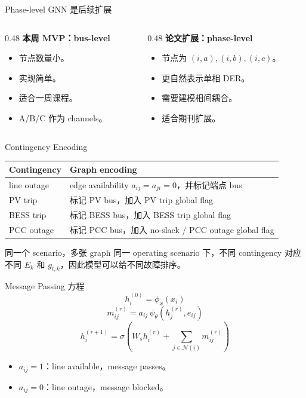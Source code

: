 \documentclass[aspectratio=169,11pt]{beamer}
\begin{document}
\begin{frame}{Phase-level GNN 是后续扩展}
\begin{columns}
\begin{column}{0.48\textwidth}
\textbf{本周 MVP：bus-level}
\begin{itemize}
  \item 节点数量小。
  \item 实现简单。
  \item 适合一周课程。
  \item A/B/C 作为 channels。
\end{itemize}
\end{column}
\begin{column}{0.48\textwidth}
\textbf{论文扩展：phase-level}
\begin{itemize}
  \item 节点为 $(i,a),(i,b),(i,c)$。
  \item 更自然表示单相 DER。
  \item 需要建模相间耦合。
  \item 适合期刊扩展。
\end{itemize}
\end{column}
\end{columns}
\end{frame}

\begin{frame}{Contingency Encoding}
\small
\begin{tabular}{ll}
\toprule
Contingency & Graph encoding \\
\midrule
line outage & edge availability $a_{ij}=a_{ji}=0$，并标记端点 bus \\
PV trip & 标记 PV bus，加入 PV trip global flag \\
BESS trip & 标记 BESS bus，加入 BESS trip global flag \\
PCC outage & 标记 PCC bus，加入 no-slack / PCC outage global flag \\
\bottomrule
\end{tabular}
\vspace{0.3cm}
\begin{block}{同一个 scenario，多张 graph}
同一 operating scenario 下，不同 contingency 对应不同 $E_k$ 和 $g_{t,k}$，因此模型可以给不同故障排序。
\end{block}
\end{frame}

\begin{frame}{Message Passing 方程}
\[
h_i^{(0)}=\phi_x(x_i)
\]
\[
m_{ij}^{(r)}=a_{ij}\,\psi_\theta\left(h_j^{(r)},e_{ij}\right)
\]
\[
h_i^{(r+1)}=\sigma\left(W_s h_i^{(r)}+\sum_{j\in\mathcal N(i)}m_{ij}^{(r)}\right)
\]
\begin{itemize}
  \item $a_{ij}=1$：line available，message passes。
  \item $a_{ij}=0$：line outage，message blocked。
\end{itemize}
\end{frame}
\end{document}
